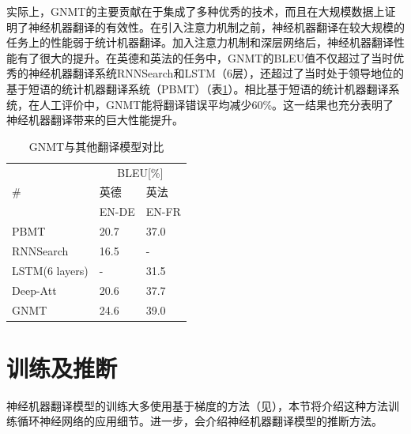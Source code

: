 \parinterval 实际上，GNMT的主要贡献在于集成了多种优秀的技术，而且在大规模数据上证明了神经机器翻译的有效性。在引入注意力机制之前，神经机器翻译在较大规模的任务上的性能弱于统计机器翻译。加入注意力机制和深层网络后，神经机器翻译性能有了很大的提升。在英德和英法的任务中，GNMT的BLEU值不仅超过了当时优秀的神经机器翻译系统RNNSearch和LSTM（6层），还超过了当时处于领导地位的基于短语的统计机器翻译系统（PBMT）（表\ref{tab:10-8}）。相比基于短语的统计机器翻译系统，在人工评价中，GNMT能将翻译错误平均减少60\%。这一结果也充分表明了神经机器翻译带来的巨大性能提升。

\begin{table}[htp]
\centering
\caption{GNMT与其他翻译模型对比}
\label{tab:10-8}
\begin{tabular}{l l l}
\multicolumn{1}{l|}{\multirow{3}{*}{\#}} & \multicolumn{2}{c}{BLEU[\%]} \\
\multicolumn{1}{l|}{}                    & 英德  & 英法                                               \\
\multicolumn{1}{l|}{}                    & EN-DE  & EN-FR                                               \\ \hline
\multicolumn{1}{l|}{PBMT}                & 20.7            & 37.0            \\
\multicolumn{1}{l|}{RNNSearch}           & 16.5            & -               \\
\multicolumn{1}{l|}{LSTM(6 layers)}      & -               & 31.5            \\
\multicolumn{1}{l|}{Deep-Att}            & 20.6            & 37.7            \\
\multicolumn{1}{l|}{GNMT}                & 24.6            & 39.0            \\
\end{tabular}
\end{table}

\sectionnewpage
\section{训练及推断}

神经机器翻译模型的训练大多使用基于梯度的方法（见{\chapternine}），本节将介绍这种方法训练循环神经网络的应用细节。进一步，会介绍神经机器翻译模型的推断方法。

